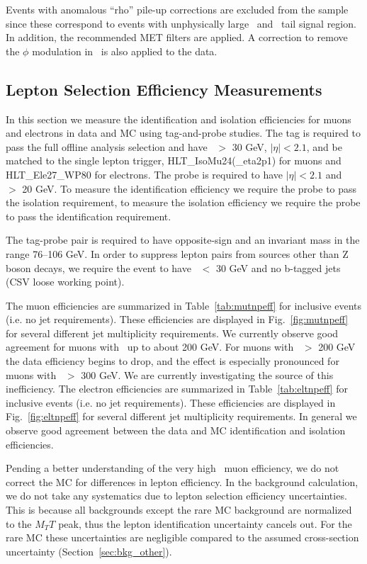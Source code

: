 Events with anomalous ``rho'' pile-up corrections are excluded from the sample since these 
correspond to events with unphysically large \met\ and \mt\ tail
signal region. In addition, the recommended MET filters are applied. 
A correction to remove the $\phi$ modulation in \met\ is also applied
to the data.


\subsection{Lepton Selection Efficiency Measurements}
\label{sec:lepEff}

In this section we measure the identification and isolation efficiencies for muons and electrons in data and MC using tag-and-probe studies. 
The tag is required to pass the full offline analysis selection and have \pt\ $>$ 30 GeV, $|\eta|<2.1$, and be matched to the single
lepton trigger, HLT\_IsoMu24(\_eta2p1) for muons and HLT\_Ele27\_WP80 for electrons. 
The probe is required to have $|\eta|<2.1$ and \pt\ $>$ 20 GeV. To measure the identification efficiency we require the probe to pass the isolation requirement,
to measure the isolation efficiency we require the probe to pass the
identification requirement.

The tag-probe pair is required to have opposite-sign and an invariant mass in the range 76--106 GeV.
In order to suppress lepton pairs from sources other than Z boson
decays, we require the event to have \met\ $<$ 30 GeV and no b-tagged
jets (CSV loose working point).

The muon efficiencies are summarized in Table~\ref{tab:mutnpeff} for inclusive events (i.e. no jet requirements). These efficiencies are displayed in Fig.~\ref{fig:mutnpeff} for
several different jet multiplicity requirements. We currently observe good agreement for muons with \pt\ up to about 200 GeV. For muons with \pt\ $>$ 200 GeV the data efficiency
begins to drop, and the effect is especially pronounced for muons with \pt\ $>$ 300 GeV. We are currently investigating the source of this inefficiency.
The electron efficiencies are summarized in Table~\ref{tab:eltnpeff} for inclusive events (i.e. no jet requirements). These efficiencies are displayed in Fig.~\ref{fig:eltnpeff} for several different jet multiplicity requirements. In general we observe good agreement between the data and MC identification and isolation efficiencies.

Pending a better understanding of the very high \pt\ muon efficiency,  we
do not correct the MC for differences in lepton efficiency.  In the
background calculation, we do not take any systematics due to lepton
selection
efficiency uncertainties.  This is because all backgrounds except the 
rare MC background are normalized to the $M_TT$ peak, thus the lepton
identification uncertainty cancels out.  For the rare MC these
uncertainties
are negligible compared to the assumed cross-section uncertainty
(Section~\ref{sec:bkg_other}).




